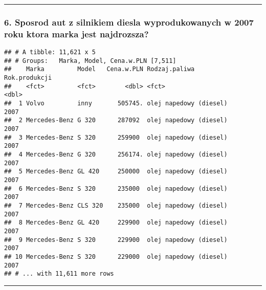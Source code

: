 \documentclass[]{article}
\newenvironment{Shaded}{\begin{snugshade}}{\end{snugshade}}
\newcommand{\KeywordTok}[1]{\textcolor[rgb]{0.13,0.29,0.53}{\textbf{#1}}}
\newcommand{\DecValTok}[1]{\textcolor[rgb]{0.00,0.00,0.81}{#1}}
\newcommand{\StringTok}[1]{\textcolor[rgb]{0.31,0.60,0.02}{#1}}
\newcommand{\OperatorTok}[1]{\textcolor[rgb]{0.81,0.36,0.00}{\textbf{#1}}}
\newcommand{\NormalTok}[1]{#1}
\begin{document}
\begin{center}\rule{0.5\linewidth}{\linethickness}\end{center}

\subsubsection{6. Sposrod aut z silnikiem diesla wyprodukowanych w 2007
roku ktora marka jest
najdrozsza?}\label{sposrod-aut-z-silnikiem-diesla-wyprodukowanych-w-2007-roku-ktora-marka-jest-najdrozsza}

\begin{Shaded}
\end{Shaded}

\begin{verbatim}
## # A tibble: 11,621 x 5
## # Groups:   Marka, Model, Cena.w.PLN [7,511]
##    Marka         Model   Cena.w.PLN Rodzaj.paliwa          Rok.produkcji
##    <fct>         <fct>        <dbl> <fct>                          <dbl>
##  1 Volvo         inny       505745. olej napedowy (diesel)          2007
##  2 Mercedes-Benz G 320      287092  olej napedowy (diesel)          2007
##  3 Mercedes-Benz S 320      259900  olej napedowy (diesel)          2007
##  4 Mercedes-Benz G 320      256174. olej napedowy (diesel)          2007
##  5 Mercedes-Benz GL 420     250000  olej napedowy (diesel)          2007
##  6 Mercedes-Benz S 320      235000  olej napedowy (diesel)          2007
##  7 Mercedes-Benz CLS 320    235000  olej napedowy (diesel)          2007
##  8 Mercedes-Benz GL 420     229900  olej napedowy (diesel)          2007
##  9 Mercedes-Benz S 320      229900  olej napedowy (diesel)          2007
## 10 Mercedes-Benz S 320      229000  olej napedowy (diesel)          2007
## # ... with 11,611 more rows
\end{verbatim}

\begin{center}\rule{0.5\linewidth}{\linethickness}\end{center}
\end{document}
